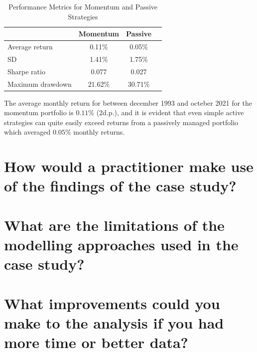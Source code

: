\documentclass{article}
\begin{document}
\begin{table}
    \centering
    
    \caption{Performance Metrics for Momentum and Passive Strategies}
    \label{table:performance}
    \begin{tabular}{lccc}
        \toprule
        & \textbf{Momentum} & \textbf{Passive} \\
        \midrule
        Average return & 0.11\% & 0.05\% \\
        SD & 1.41\% & 1.75\% \\
        Sharpe ratio & 0.077 & 0.027 \\
        Maximum drawdown & 21.62\% & 30.71\% \\
        \bottomrule
    \end{tabular}
\end{table}

The average monthly return for between december 1993 and octeber 2021 for the momentum portfolio is $0.11\%$ (2d.p.), and it is evident that even simple active strategies can quite easily exceed returns from a passively managed portfolio which averaged $0.05\%$ monthly returns. 

\newpage\section*{How would a practitioner make use of the findings of the case study?}

\newpage\section*{What are the limitations of the modelling approaches used in the case study?}

\newpage\section*{What improvements could you make	to the	analysis if	you	had	more time or better data?}

 

\end{document}
